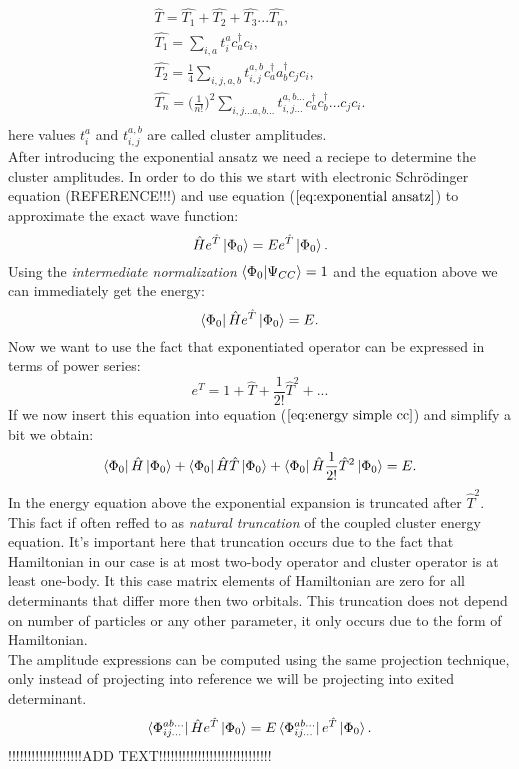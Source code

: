 \documentclass[twoside,english]{uiofysmaster}
\theoremstyle{definition}
\begin{document}
\begin{align}
\hat{T}= \hat{T_1}+ \hat{T_2}+ \hat{T_3}...\hat{T_n},\\
\hat{T_1}= \sum_{i,a} t_i^a c_a^\dagger c_i, \label{eq:T1}\\
\hat{T_2}= \frac{1}{4} \sum_{i,j,a,b} t_{i,j}^{a,b} c_a^\dagger a_b^\dagger c_j c_i,\\
\hat{T_n}= \bigg(\frac{1}{n!}\bigg)^2 \sum_{i,j \dots a,b\dots } t_{i,j\dots}^{a,b\dots}  c_a^\dagger c_b^\dagger \dots c_j c_i.\\
\end{align}
here values $t_i^a $ and $t_{i,j}^{a,b}$ are called cluster amplitudes. \\
After introducing the exponential ansatz we need a reciepe to determine the cluster amplitudes. In order to do this we start with electronic Schrödinger equation (REFERENCE!!!) and use equation ($\ref{eq:exponential ansatz}$) to approximate the exact wave function:
\begin{equation}
	\hat{H}e^{\hat{T}}\ket{\Phi_0}=Ee^{\hat{T}}\ket{\Phi_0}.
\end{equation}
Using the \textit{intermediate normalization} $\braket{\Phi_0|\Psi_{CC}}=1$ and  the equation above we can immediately get the energy:
\begin{equation}\label{eq:energy simple cc}
\bra{\Phi_0}\hat{H}e^{\hat{T}}\ket{\Phi_0}=E.
\end{equation}
Now we want to use the fact that exponentiated operator can be expressed in terms of power series:
 \begin{equation}
 e^{\hat{T}}= 1+ \hat{T}+\frac{1}{2!}\hat{T}^2+ ...
 \end{equation}
If we now insert this equation into equation ($\ref{eq:energy simple cc}$) and simplify a bit we obtain:
\begin{equation}
 \bra{\Phi_0}\hat{H}\ket{\Phi_0} +  \bra{\Phi_0}\hat{H}\hat{T}\ket{\Phi_0} +\bra{\Phi_0}\hat{H}\frac{1}{2!}\hat{T}^2\ket{\Phi_0}  = E.
\end{equation}
In the energy equation above the exponential expansion is truncated after $\hat{T}^2$. This fact if often reffed to as \textit{natural truncation} of the coupled cluster energy equation. It's important here that truncation occurs due to the fact that Hamiltonian in our case is at most two-body operator and cluster operator is at least one-body. It this case matrix elements of Hamiltonian are zero for all determinants that differ more then two orbitals. This truncation does not depend on number of particles or any other parameter, it only occurs due to the form of Hamiltonian. \\
The amplitude expressions can be computed using the same projection technique, only instead of projecting into reference we will be projecting into exited determinant. 
\begin{equation}\label{eq:ampl simple}
\bra{\Phi_{ij...}^{ab...}}\hat{H} e^{\hat{T}}\ket{\Phi_0} = E\bra{\Phi_{ij...}^{ab...}} e^{\hat{T}}\ket{\Phi_0}.
\end{equation}
!!!!!!!!!!!!!!!!!!!ADD TEXT!!!!!!!!!!!!!!!!!!!!!!!!!!!!!
\end{document}
